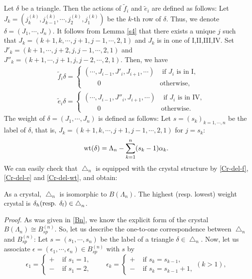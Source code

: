 Let ${\delta}$ be a triangle. 
Then the actions of ${\tilde{f}_i}$ and ${\tilde{e}_i}$ are defined as follows:
Let $J_k=({j_{k}^{(k)}},{j_{k-1}^{(k)}},{\cdots},{j_{2}^{(k)}},{j_{1}^{(k)}})$ be the $k$-th
row of ${\delta}$. Thus, we denote ${\delta}=(J_1,{\cdots},J_n)$.
It follows from  Lemma \ref{s4} that
there exists a unique $j$ such that 
$J_k=(k+1,k,{\cdots},j+1,j-1,{\cdots},2,1)$ and $J_k$ is in one of I,II,III,IV.
Set $J'_k=(k+1,{\cdots},j+2,j,j-1,{\cdots},2,1)$ and 
$J''_k=(k+1,{\cdots},j+1,j,j-2,{\cdots},2,1)$.
Then, we have
\begin{eqnarray}
&&{\tilde{f}_i}{\delta}=\begin{cases}
({\cdots},J_{i-1},J'_i,J_{i+1},{\cdots})&\text{ if $J_i$ is in I},\\
{\qquad} 0&\text{otherwise,}
\end{cases}\label{Cr-del-f}\\
&&{\tilde{e}_i}{\delta}=\begin{cases}
({\cdots},J_{i-1},J''_i,J_{i+1},{\cdots})&\text{ if $J_i$ is in IV},\\
{\qquad} 0&\text{otherwise.}
\end{cases}\label{Cr-del-e}
\end{eqnarray}
The weight of ${\delta}=(J_1,{\cdots},J_n)$ is defined as follows:
Let $s=(s_k)_{k=1,{\cdots},n}$ be the label of ${\delta}$, that is, 
$J_k=(k+1,k,{\cdots}, j+1,j-1,{\cdots},2,1)$ for $j=s_k$:
\begin{equation}
{{\rm wt}}({\delta})={\Lambda}_n-\sum_{k=1}^{n}(s_k-1){\alpha}_k.
\label{Cr-del-wt}
\end{equation}
We can easily check that ${\bigtriangleup}_n$ is equipped with 
the crystal structure by 
\eqref{Cr-del-f}, \eqref{Cr-del-e} and 
\eqref{Cr-del-wt}, and obtain:
\begin{pro}\label{del-spin-b}
As a crystal, ${\bigtriangleup}_n$ is isomorphic to $B({\Lambda}_n)$.
The highest (resp. lowest) weight crystal is 
${\delta}_h\hbox{(resp. ${\delta}_l$)}\in{\bigtriangleup}_n$.
\end{pro}
{\sl Proof.}
As was given in \ref{Bn}, we know the explicit form of the crystal 
$B({\Lambda}_n)\cong B^{(n)}_{sp}$. So, let us describe the 
one-to-one correspondence between ${\bigtriangleup}_n$ and $B^{(n)}_{sp}$:
Let $s=(s_1,{\cdots},s_n)$ be the label of a triangle ${\delta}\in {\bigtriangleup}_n$.
Now, let us associate ${\epsilon}=({\epsilon}_1,{\cdots},{\epsilon}_n)\in B^{(n)}_{sp}$ with $s$ by
\begin{equation}
{\epsilon}_1=\begin{cases}+&\text{ if }s_1=1,\\
-&\text{ if }s_1=2,
\end{cases}{\qquad}
{\epsilon}_k=\begin{cases}+&\text{ if }s_{k}=s_{k-1},\\
-&\text{ if }s_{k}=s_{k-1}+1,
\end{cases}(k>1),
\end{equation}
